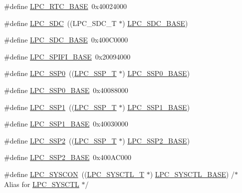 \begin{DoxyCompactItemize}
\item 
\#define \hyperlink{group__PERIPH__407X__8X__BASE_ga4618213cf968f8245814d7d3e7aa2e2e}{L\+P\+C\+\_\+\+R\+T\+C\+\_\+\+B\+A\+SE}~0x40024000
\item 
\#define \hyperlink{group__PERIPH__407X__8X__BASE_ga3914f06f63d5e9e9156865b86956bca8}{L\+P\+C\+\_\+\+S\+DC}~((L\+P\+C\+\_\+\+S\+D\+C\+\_\+T              $\ast$) \hyperlink{group__PERIPH__407X__8X__BASE_gab8f044e5911a6bf51879e4614bf2a0a3}{L\+P\+C\+\_\+\+S\+D\+C\+\_\+\+B\+A\+SE})
\item 
\#define \hyperlink{group__PERIPH__407X__8X__BASE_gab8f044e5911a6bf51879e4614bf2a0a3}{L\+P\+C\+\_\+\+S\+D\+C\+\_\+\+B\+A\+SE}~0x400\+C0000
\item 
\#define \hyperlink{group__PERIPH__407X__8X__BASE_gad284a5971366e0a8b5fe9881fdb9aa0c}{L\+P\+C\+\_\+\+S\+P\+I\+F\+I\+\_\+\+B\+A\+SE}~0x20094000
\item 
\#define \hyperlink{group__PERIPH__407X__8X__BASE_gac213e0325a8e8a972bd2e0dd6ccf353c}{L\+P\+C\+\_\+\+S\+S\+P0}~((\hyperlink{structLPC__SSP__T}{L\+P\+C\+\_\+\+S\+S\+P\+\_\+T}              $\ast$) \hyperlink{group__PERIPH__407X__8X__BASE_ga53fb1af80b541545988f2a966681abfd}{L\+P\+C\+\_\+\+S\+S\+P0\+\_\+\+B\+A\+SE})
\item 
\#define \hyperlink{group__PERIPH__407X__8X__BASE_ga53fb1af80b541545988f2a966681abfd}{L\+P\+C\+\_\+\+S\+S\+P0\+\_\+\+B\+A\+SE}~0x40088000
\item 
\#define \hyperlink{group__PERIPH__407X__8X__BASE_ga09c4610ada1d9aa18913963cbd1a6e52}{L\+P\+C\+\_\+\+S\+S\+P1}~((\hyperlink{structLPC__SSP__T}{L\+P\+C\+\_\+\+S\+S\+P\+\_\+T}              $\ast$) \hyperlink{group__PERIPH__407X__8X__BASE_ga05d118997f53f596d3a087f8b91a1969}{L\+P\+C\+\_\+\+S\+S\+P1\+\_\+\+B\+A\+SE})
\item 
\#define \hyperlink{group__PERIPH__407X__8X__BASE_ga05d118997f53f596d3a087f8b91a1969}{L\+P\+C\+\_\+\+S\+S\+P1\+\_\+\+B\+A\+SE}~0x40030000
\item 
\#define \hyperlink{group__PERIPH__407X__8X__BASE_ga1e342299e20b4a502b4c71d292fc8eeb}{L\+P\+C\+\_\+\+S\+S\+P2}~((\hyperlink{structLPC__SSP__T}{L\+P\+C\+\_\+\+S\+S\+P\+\_\+T}              $\ast$) \hyperlink{group__PERIPH__407X__8X__BASE_ga1460d4b0a86fa00b3d3ef8abd21abbc1}{L\+P\+C\+\_\+\+S\+S\+P2\+\_\+\+B\+A\+SE})
\item 
\#define \hyperlink{group__PERIPH__407X__8X__BASE_ga1460d4b0a86fa00b3d3ef8abd21abbc1}{L\+P\+C\+\_\+\+S\+S\+P2\+\_\+\+B\+A\+SE}~0x400\+A\+C000
\item 
\#define \hyperlink{group__PERIPH__407X__8X__BASE_gabe45c10a979fe812e3d9ecd72fe33a2f}{L\+P\+C\+\_\+\+S\+Y\+S\+C\+ON}~((\hyperlink{structLPC__SYSCTL__T}{L\+P\+C\+\_\+\+S\+Y\+S\+C\+T\+L\+\_\+T}           $\ast$) \hyperlink{group__PERIPH__407X__8X__BASE_gae4670b50fe27772fa31de1da10bec7b7}{L\+P\+C\+\_\+\+S\+Y\+S\+C\+T\+L\+\_\+\+B\+A\+SE}) /$\ast$ Alias for \hyperlink{group__PERIPH__407X__8X__BASE_ga30cc92eba86b30295b3dcf3da503b736}{L\+P\+C\+\_\+\+S\+Y\+S\+C\+TL} $\ast$/

\end{DoxyCompactItemize}
